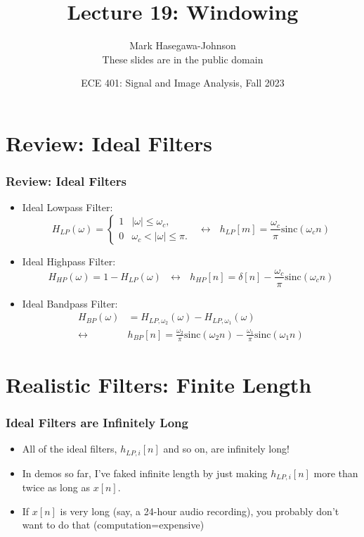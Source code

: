 \documentclass{beamer}
\title{Lecture 19: Windowing}
\author{Mark Hasegawa-Johnson\\These slides are in the public domain}
\date{ECE 401: Signal and Image Analysis, Fall 2023}
\begin{document}
\begin{frame}
  \maketitle
\end{frame}

\begin{frame}
  \tableofcontents
\end{frame}

\section[Review]{Review: Ideal Filters}
\setcounter{subsection}{1}

\begin{frame}
  \frametitle{Review: Ideal Filters}
  \begin{itemize}
  \item Ideal Lowpass Filter:
    \[
    H_{LP}(\omega)
    = \begin{cases} 1& |\omega|\le\omega_c,\\
      0 & \omega_c<|\omega|\le\pi.
    \end{cases}~~~\leftrightarrow~~~
    h_{LP}[m]=\frac{\omega_c}{\pi}\mbox{sinc}(\omega_c n)
    \]
  \item Ideal Highpass Filter:
    \[
    H_{HP}(\omega)=1-H_{LP}(\omega)~~~\leftrightarrow~~~
    h_{HP}[n]=\delta[n]-\frac{\omega_c}{\pi}\mbox{sinc}(\omega_c n)
    \]
  \item Ideal Bandpass Filter:
    \begin{align*}
      H_{BP}(\omega)&=H_{LP,\omega_2}(\omega)-H_{LP,\omega_1}(\omega)\\
      \leftrightarrow
      &h_{BP}[n]=\frac{\omega_2}{\pi}\mbox{sinc}(\omega_2 n)-\frac{\omega_1}{\pi}\mbox{sinc}(\omega_1 n)
    \end{align*}
  \end{itemize}
\end{frame}


\section[Finite-Length]{Realistic Filters: Finite Length}
\setcounter{subsection}{1}

\begin{frame}
  \frametitle{Ideal Filters are Infinitely Long}
  
  \begin{itemize}
  \item All of the ideal filters, $h_{LP,i}[n]$ and so on, are infinitely
    long!
  \item In demos so far, I've faked infinite length by just making
    $h_{LP,i}[n]$ more than twice as long as $x[n]$.
  \item If $x[n]$ is very long (say, a 24-hour audio recording), you
    probably don't want to do that (computation=expensive)
  \end{itemize}
\end{frame}
\end{document}
